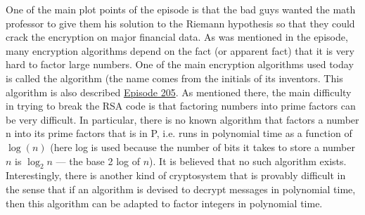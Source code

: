 

One of the main plot points of the episode is that the bad guys wanted the math professor to give them his solution to the Riemann hypothesis so that they could crack the encryption on major financial data. As was mentioned in the episode, many encryption algorithms depend on the fact (or apparent fact) that it is very hard to factor large numbers. One of the main encryption algorithms used today is called the  algorithm (the name comes from the initials of its inventors. This algorithm is also described \hyperref[ep205]{Episode 205}. As mentioned there, the main difficulty in trying to break the RSA code is that factoring numbers into prime factors can be very difficult. In particular, there is no known algorithm that factors a number n into its prime factors that is in P, i.e. runs in polynomial time as a function of $\log(n)$ (here log is used because the number of bits it takes to store a number $n$ is $\log_2 n$ --- the base 2 log of $n$). It is believed that no such algorithm exists. Interestingly, there is another kind of cryptosystem that is provably difficult in the sense that if an algorithm is devised to decrypt messages in polynomial time, then this algorithm can be adapted to factor integers in polynomial time.